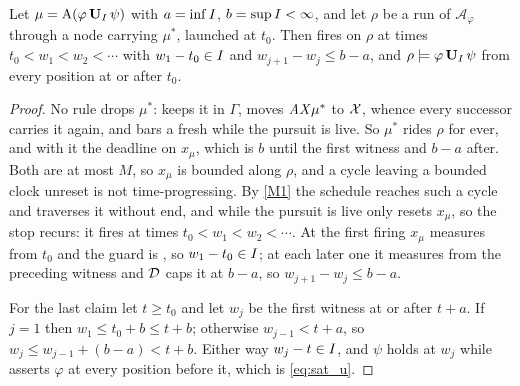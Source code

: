 %
%
\begin{lemma}[Recurrence]\label{lem:recurrence}
Let $\mu=\mathrm{A}(\varphi\,\mathbf{U}_I\,\psi)$ with $a=\inf I$, $b=\sup I<\infty$, and let
$\rho$ be a run of $\mathcal A_\varphi$ through a node carrying $\mu^{\ast}$, launched at $t_0$. Then
 fires on $\rho$ at times $t_0<w_1<w_2<\cdots$ with $w_1-t_0\in I$ and
$w_{j+1}-w_j\le b-a$, and $\rho\models\varphi\,\mathbf{U}_I\,\psi$ from every position at or after
$t_0$.
\end{lemma}
\begin{proof}
No rule drops $\mu^{\ast}$:  keeps it in $\Gamma$,  moves
$\mathit{AX}\mu^{\ast}$ to $\mathcal{X}$, whence every successor carries it again, and  bars a fresh
 while the pursuit is live. So $\mu^{\ast}$ rides $\rho$ for ever, and with it the
deadline on $x_\mu$, which is $b$ until the first witness and $b-a$ after. Both are at most $M$, so
$x_\mu$ is bounded along $\rho$, and a cycle leaving a bounded clock unreset is not
time-progressing. By \ref{M1} the schedule reaches such a cycle and traverses it without end, and
while the pursuit is live only  resets $x_\mu$, so the stop recurs: it fires at
times $t_0<w_1<w_2<\cdots$. At the first firing $x_\mu$ measures from $t_0$ and the guard is \kI, so
$w_1-t_0\in I$; at each later one it measures from the preceding witness and $\mathcal{D}$ caps it at
$b-a$, so $w_{j+1}-w_j\le b-a$.

For the last claim let $t\ge t_0$ and let $w_j$ be the first witness at or after $t+a$. If $j=1$ then
$w_1\le t_0+b\le t+b$; otherwise $w_{j-1}<t+a$, so $w_j\le w_{j-1}+(b-a)<t+b$. Either way
$w_j-t\in I$, and $\psi$ holds at $w_j$ while  asserts $\varphi$ at every position
before it, which is \eqref{eq:sat_u}.
\end{proof}

